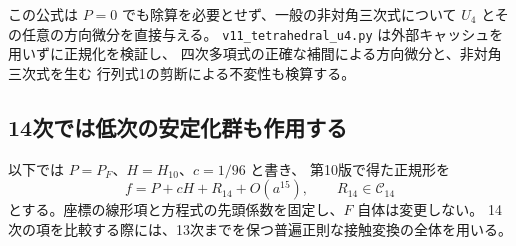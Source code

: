 \documentclass[a4paper,11pt]{ltjsarticle}
\theoremstyle{definition}
\begin{document}
この公式は $P=0$ でも除算を必要とせず、一般の非対角三次式について
$U_4$ とその任意の方向微分を直接与える。
\texttt{v11\_tetrahedral\_u4.py} は外部キャッシュを用いずに正規化を検証し、
四次多項式の正確な補間による方向微分と、非対角三次式を生む
行列式1の剪断による不変性も検算する。

\subsection{14次では低次の安定化群も作用する}
\label{subsec:v11-filtered-contact}

以下では $P=P_F$、$H=H_{10}$、$c=1/96$ と書き、
第10版で得た正規形を
\[
 f=P+cH+R_{14}+O(a^{15}),\qquad R_{14}\in\mathcal C_{14}
\]
とする。座標の線形項と方程式の先頭係数を固定し、$F$ 自体は変更しない。
14次の項を比較する際には、13次までを保つ普遍正則な接触変換の全体を用いる。
\end{document}
